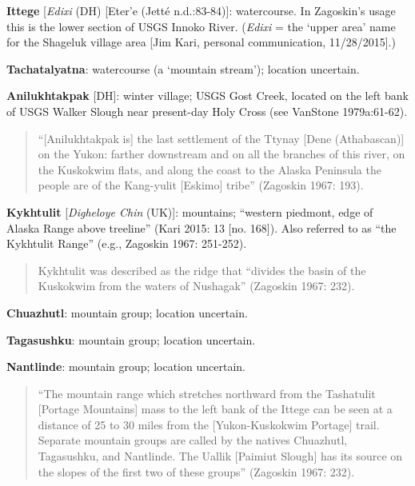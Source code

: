 \begin{hang}
\textbf{Ittege} [\textit{Edixi} (DH) [Eter’e (Jetté n.d.:83-84)]: watercourse. In Zagoskin’s usage this is the lower section of USGS Innoko River. (\textit{Edixi} = the ‘upper area’ name for the Shageluk village area [Jim Kari, personal communication, 11/28/2015].)



\textbf{Tachatalyatna}: watercourse (a ‘mountain stream’); location uncertain.



\textbf{Anilukhtakpak} [DH]: winter village; USGS Gost Creek, located on the left bank of USGS Walker Slough near present-day Holy Cross (see VanStone 1979a:61-62).



\begin{quote}“[Anilukhtakpak is] the last settlement of the Ttynay [Dene (Athabascan)] on the Yukon: farther downstream and on all the branches of this river, on the Kuskokwim flats, and along the coast to the Alaska Peninsula the people are of the Kang-yulit [Eskimo] tribe” (Zagoskin 1967: 193).
\end{quote}



\textbf{Kykhtulit} [\textit{Digheloye Chin} (UK)]: mountains; “western piedmont, edge of Alaska Range above treeline” (Kari 2015: 13 [no. 168]). Also referred to as “the Kykhtulit Range” (e.g., Zagoskin 1967: 251-252).



\begin{quote}Kykhtulit was described as the ridge that “divides the basin of the Kuskokwim from the waters of Nushagak” (Zagoskin 1967: 232).
\end{quote}



\textbf{Chuazhutl}: mountain group; location uncertain.



\textbf{Tagasushku}: mountain group; location uncertain.



\textbf{Nantlinde}: mountain group; location uncertain.

\begin{quote}
	“The mountain range which stretches northward from the Tashatulit [Portage Mountains] mass to the left bank of the Ittege can be seen at a distance of 25 to 30 miles from the [Yukon-Kuskokwim Portage] trail. Separate mountain groups are called by the natives Chuazhutl, Tagasushku, and Nantlinde. The Uallik [Paimiut Slough] has its source on the slopes of the first two of these groups” (Zagoskin 1967: 232).
\end{quote}




\end{hang}
